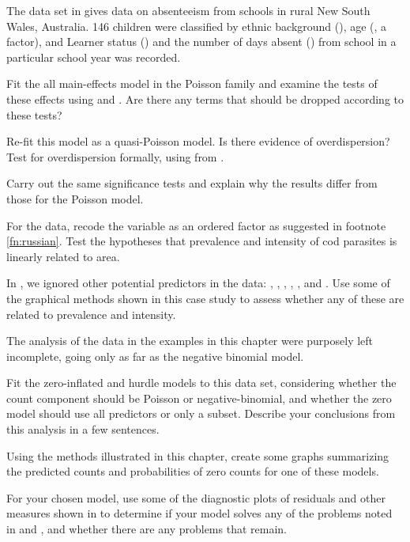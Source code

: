\documentclass[11pt]{book}\usepackage[]{graphicx}\usepackage[]{color}
\begin{document}
\begin{Exercises}
  
  \exercise The data set  in  gives data on absenteeism from schools in rural New South Wales, Australia.
   146 children were classified by ethnic background (), age (, a factor),  and Learner status ()
   and the number of days absent () from school
   in a particular school year was recorded.
   \begin{enumerate*}
    \item Fit the all main-effects model in the Poisson family and examine the tests of these effects using
     and .  Are there any terms that should be dropped according to these tests?
    \item Re-fit this model as a quasi-Poisson model.  Is there evidence of overdispersion?
    Test for overdispersion formally, using  from .
    \item Carry out the same significance tests and explain why the results differ from those for the Poisson model.
   \end{enumerate*}

  \exercise For the  data, recode the  variable as an ordered factor as suggested in
  footnote \ref{fn:russian}.  Test the hypotheses that prevalence and intensity of cod parasites is linearly
  related to area.

  \exercise In , we ignored other potential predictors in the  data:
  , , , , , and .
  Use some of the graphical methods shown in this case study to assess whether any of these are related
  to prevalence and intensity.

  \exercise The analysis of the  data in the examples in this chapter were purposely left incomplete,
  going only as far as the negative binomial model.
  \begin{enumerate*}
    \item Fit the zero-inflated and hurdle models to this data set, considering whether the count component should
    be Poisson or negative-binomial, and whether the zero model should use all predictors or only a subset.
    Describe your conclusions from this analysis in a few sentences.
    \item Using the methods illustrated in this chapter, create some graphs summarizing the predicted counts
    and probabilities of zero counts for one of these models.
    \item For your chosen model, use some of the diagnostic plots of residuals and other measures shown in
     to determine if your model solves any of the problems noted in 
    and , and whether there are any problems that remain.
  \end{enumerate*}


\end{Exercises}
\end{document}
